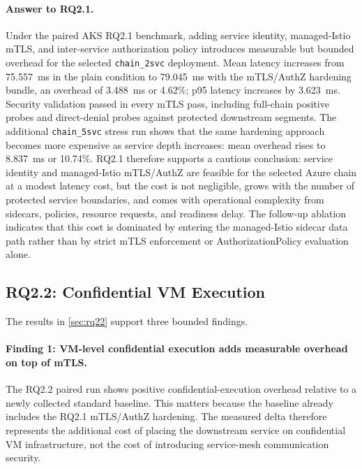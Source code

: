 \paragraph{Answer to RQ2.1.}
Under the paired AKS RQ2.1 benchmark, adding service identity, managed-Istio
mTLS, and inter-service authorization policy introduces measurable but
bounded overhead for the selected \texttt{chain\_2svc} deployment. Mean
latency increases from 75.557~ms in the plain condition to 79.045~ms with
the mTLS/AuthZ hardening bundle, an overhead of 3.488~ms or 4.62\%; p95
latency increases by 3.623~ms. Security validation passed in every mTLS
pass, including full-chain positive probes and direct-denial probes against
protected downstream segments. The additional \texttt{chain\_5svc} stress run
shows that the same hardening approach becomes more expensive as service
depth increases: mean overhead rises to 8.837~ms or 10.74\%. RQ2.1 therefore
supports a cautious conclusion: service identity and managed-Istio mTLS/AuthZ
are feasible for the selected Azure chain at a modest latency cost, but the
cost is not negligible, grows with the number of protected service
boundaries, and comes with operational complexity from sidecars, policies,
resource requests, and readiness delay. The follow-up ablation indicates that
this cost is dominated by entering the managed-Istio sidecar data path rather
than by strict mTLS enforcement or AuthorizationPolicy evaluation alone.

\subsection{RQ2.2: Confidential VM Execution}
\label{sec:analysis-rq22}

The results in \cref{sec:rq22} support three bounded findings.

\paragraph{Finding 1: VM-level confidential execution adds measurable overhead on top of mTLS.}
The RQ2.2 paired run shows positive confidential-execution overhead relative
to a newly collected standard baseline. This matters because the baseline
already includes the RQ2.1 mTLS/AuthZ hardening. The measured delta therefore
represents the additional cost of placing the downstream service on
confidential VM infrastructure, not the cost of introducing service-mesh
communication security.

